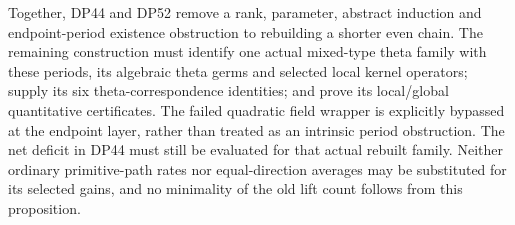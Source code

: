Together, DP44 and DP52 remove a rank, parameter, abstract induction and
endpoint-period existence obstruction to rebuilding a shorter even chain.
The remaining construction must identify one actual mixed-type theta
family with these periods, its algebraic theta germs and selected local
kernel operators; supply its six theta-correspondence identities; and
prove its local/global quantitative certificates.
The failed quadratic field wrapper is explicitly bypassed at the
endpoint layer, rather than treated as an intrinsic period obstruction.
The net deficit in DP44 must still be evaluated for that actual rebuilt
family. Neither ordinary primitive-path rates nor equal-direction averages
may be substituted for its selected gains, and no minimality of the old
lift count follows from this proposition.
